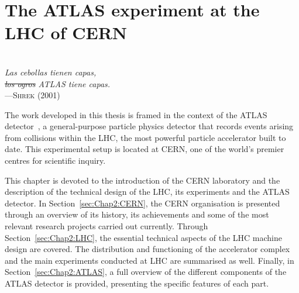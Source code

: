 \begin{comment}
%
asdf
\end{comment}


\chapter{The ATLAS experiment at the LHC of CERN}

\vspace*{0.1 cm} 
\hspace*{200pt} \\
\hspace*{120pt} \textit{Las cebollas tienen capas,} \\
\hspace*{120pt} \textit{\sout{los ogros} ATLAS tiene capas.} \\
\hspace*{140pt} ---\textsc{Shrek (2001)} \\%
\vspace*{2cm} 

\label{chap:ATLAS}

The work developed in this thesis is framed in the context of the ATLAS detector~\cite{ATLAS:1999vwa}, 
a general-purpose particle physics detector that records events arising from collisions within the 
LHC, the most powerful particle accelerator built to date. 
This experimental setup is located at CERN, one of the world's premier centres for scientific inquiry.

This chapter is devoted to the introduction of the CERN laboratory and the description of the technical
design of the LHC, its experiments and the ATLAS detector.
In Section~\ref{sec:Chap2:CERN}, the CERN organisation is presented through an overview of its history, its achievements and 
some of the most relevant research projects carried out currently.
Through Section~\ref{sec:Chap2:LHC}, the essential technical aspects of the LHC machine design are covered. 
The distribution and functioning of the
accelerator complex and the main experiments conducted at LHC are summarised as well. 
Finally, in Section~\ref{sec:Chap2:ATLAS}, a full overview of the different components of the ATLAS detector is provided, presenting
the specific features of each part.


